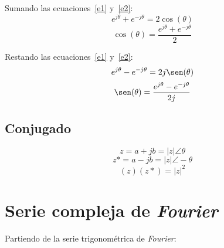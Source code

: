 Sumando las ecuaciones~\ref{e1} y~\ref{e2}:
\begin{equation*}
    e^{j\theta}+e^{-j\theta}=2\cos(\theta)
\end{equation*}
\begin{equation}
    \cos(\theta)=\frac{e^{j\theta}+e^{-j\theta}}{2}
\end{equation}

Restando las ecuaciones~\ref{e1} y~\ref{e2}:
\begin{equation*}
    e^{j\theta}-e^{-j\theta}=2j\sen(\theta)
\end{equation*}
\begin{equation}
    \sen(\theta)=\frac{e^{j\theta}-e^{-j\theta}}{2j}
\end{equation}

\subsection{Conjugado}

\begin{figure}[H]
    \centering
    
\end{figure}

\begin{equation*}
    z=a+jb=|z|\angle\theta
\end{equation*}
\begin{equation*}
    z*=a-jb=|z|\angle-\theta
\end{equation*}
\begin{equation*}
    (z)(z*)={|z|}^2
\end{equation*}

\section{Serie compleja de \emph{Fourier}}
Partiendo de la serie trigonométrica de \emph{Fourier}:


